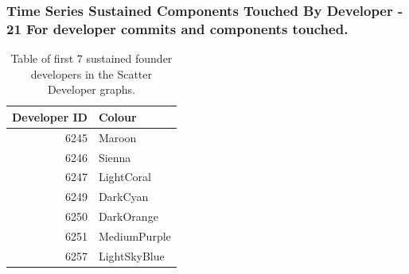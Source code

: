 \subsubsection{Time Series Sustained Components Touched By Developer - 21 For developer commits and components touched.} 
\begin{table}[H]
\centering
\caption{Table of first 7 sustained founder developers in the Scatter Developer graphs. } 
\label{tab:21first_developerssustained_founder}
\begin{tabular}{rl}
\toprule
\textbf{Developer ID} & \textbf{Colour} \\ 
\midrule
6245 & \color{Maroon}Maroon \\ 
6246 & \color{Sienna}Sienna \\ 
6247 & \color{LightCoral}LightCoral \\ 
6249 & \color{DarkCyan}DarkCyan \\ 
6250 & \color{DarkOrange}DarkOrange \\ 
6251 & \color{MediumPurple}MediumPurple \\ 
6257 & \color{LightSkyBlue}LightSkyBlue \\ 
\bottomrule
\end{tabular}
\end{table}
\newpage 
